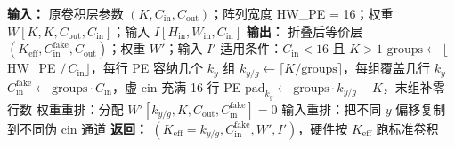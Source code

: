 \documentclass[border=4pt,varwidth=18cm]{standalone}
\begin{document}
\begin{algorithm}[H]
{\bfseries 输入：} 原卷积层参数 $(K, C_\text{in}, C_\text{out})$；阵列宽度 HW\_PE = 16；权重 $W[K, K, C_\text{out}, C_\text{in}]$；输入 $I[H_\text{in}, W_\text{in}, C_\text{in}]$\;
{\bfseries 输出：} 折叠后等价层 $(K_\text{eff}, C_\text{in}^\text{fake}, C_\text{out})$；权重 $W'$；输入 $I'$\;
\BlankLine
适用条件：$C_\text{in} < 16$ 且 $K > 1$\;
\BlankLine
$\text{groups} \leftarrow \lfloor$ HW\_PE $/\, C_\text{in} \rfloor$，每行 PE 容纳几个 $k_y$ 组\;
$k_{y/g} \leftarrow \lceil K / \text{groups} \rceil$，每组覆盖几行 $k_y$\;
$C_\text{in}^\text{fake} \leftarrow \text{groups} \cdot C_\text{in}$，虚 cin 充满 16 行 PE\;
$\text{pad}_{k_y} \leftarrow \text{groups} \cdot k_{y/g} - K$，末组补零行数\;
\BlankLine
权重重排：分配 $W'[k_{y/g}, K, C_\text{out}, C_\text{in}^\text{fake}] = 0$\;
\BlankLine
输入重排：把不同 $y$ 偏移复制到不同伪 cin 通道\;
\BlankLine
{\bfseries 返回：} $(K_\text{eff} = k_{y/g}, C_\text{in}^\text{fake}, W', I')$，硬件按 $K_\text{eff}$ 跑标准卷积\;
\end{algorithm}
\end{document}
